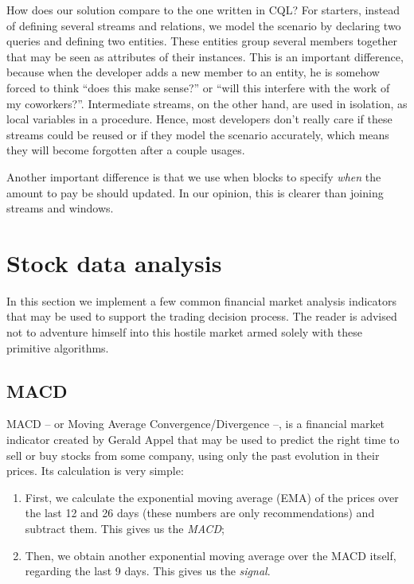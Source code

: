 How does our solution compare to the one written in CQL? For starters,
instead of defining several streams and relations, we model the
scenario by declaring two queries and defining two entities. These
entities group several members together that may be seen as attributes
of their instances. This is an important difference, because when the
developer adds a new member to an entity, he is somehow forced to
think ``does this make sense?''  or ``will this interfere with the
work of my coworkers?''. Intermediate streams, on the other hand, are
used in isolation, as local variables in a procedure. Hence, most
developers don't really care if these streams could be reused or if
they model the scenario accurately, which means they will become
forgotten after a couple usages.

Another important difference is that we use when blocks to specify
\emph{when} the amount to pay be should updated. In our opinion, this
is clearer than joining streams and windows.





\section{Stock data analysis}

In this section we implement a few common financial market analysis
indicators that may be used to support the trading decision
process. The reader is advised not to adventure himself into this
hostile market armed solely with these primitive algorithms.

\subsection{MACD}

MACD \cite{macd-book} -- or Moving Average Convergence/Divergence --,
is a financial market indicator created by Gerald Appel that may be
used to predict the right time to sell or buy stocks from some
company, using only the past evolution in their prices. Its
calculation is very simple:

\begin{enumerate}
\item First, we calculate the exponential moving average (EMA) of the
  prices over the last 12 and 26 days (these numbers are only
  recommendations) and subtract them. This gives us the \emph{MACD};
\item Then, we obtain another exponential moving average over the MACD
  itself, regarding the last 9 days. This gives us the \emph{signal}.
\end{enumerate}

